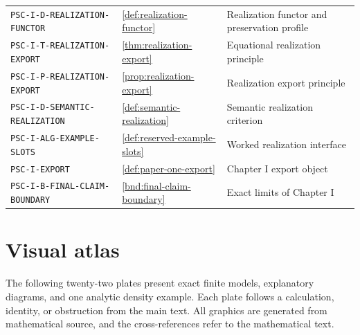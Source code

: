 \begin{longtable}{@{}p{}p{}p{}@{}}
\nolinkurl{PSC-I-D-REALIZATION-FUNCTOR} & \ref{def:realization-functor} & Realization functor and preservation profile \\
\nolinkurl{PSC-I-T-REALIZATION-EXPORT} & \ref{thm:realization-export} & Equational realization principle \\
\nolinkurl{PSC-I-P-REALIZATION-EXPORT} & \ref{prop:realization-export} & Realization export principle \\
\nolinkurl{PSC-I-D-SEMANTIC-REALIZATION} & \ref{def:semantic-realization} & Semantic realization criterion \\
\nolinkurl{PSC-I-ALG-EXAMPLE-SLOTS} & \ref{def:reserved-example-slots} & Worked realization interface \\
\nolinkurl{PSC-I-EXPORT} & \ref{def:paper-one-export} & Chapter I export object \\
\nolinkurl{PSC-I-B-FINAL-CLAIM-BOUNDARY} & \ref{bnd:final-claim-boundary} & Exact limits of Chapter I \\
\bottomrule\end{longtable}\normalsize
\clearpage\section{Visual atlas}\label{app:visual-atlas}
The following twenty-two plates present exact finite models, explanatory diagrams, and one analytic density example. Each plate follows a calculation, identity, or obstruction from the main text. All graphics are generated from mathematical source, and the cross-references refer to the mathematical text.

